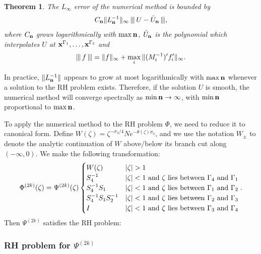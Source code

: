 \documentclass[11pt,fleqn]{article}
\numberwithin{equation}{section}
\newtheorem{theorem}{Theorem}[section]
\begin{document}
\def\nnnorm#1{ |\mskip-1.5mu\|\,{#1}\,\|\mskip-1.5mu|}

\begin{theorem}\cite{SORHFramework}
    The $L_\infty$ error of the numerical method is bounded by
%
        $$C_{\bf n} \|L_{\bf n}^{-1}\|_\infty \, \nnnorm{U -  \bar U_{\bf n}},$$
%
where $C_{\bf n}$ grows logarithmically with $\max {\bf n}$, $\bar U_{\bf n}$ is the polynomial which interpolates $U$ at ${\bf x}^{\Gamma_1},\ldots,{\bf x}^{\Gamma_\ell}$  and
%
    $$\nnnorm{f} = \| f\|_\infty + \max_{i} \| (M_i^{-1} )' f_i'   \|_\infty.$$
%
\end{theorem}


In practice, $\|L_{\bf n}^{-1}\|$ appears to grow at most logarithmically with $\max {\bf n}$ whenever a solution to the RH problem exists.  Therefore, if the solution $U$ is smooth, the numerical method will converge spectrally as $\min {\bf n} \rightarrow \infty$, with $\min {\bf n}$ proportional to $\max {\bf n}$.


To apply the numerical method to the RH problem $\Phi$, we need to reduce it to canonical form.   Define $W(\zeta) = \zeta^{-\sigma_3/4} N  e^{-\theta(\zeta)\sigma_3}$, and we use the notation $W_\pm$ to denote the analytic continuation of $W$ above/below its branch cut along $(-\infty,0)$.  We make the following transformation:
%
    \begin{equation}\label{PsiToPhi}
    \Phi^{(2k)}(\zeta) = \Psi^{(2k)}(\zeta) \begin{cases}
                W(\zeta)            & |\zeta| > 1 \\
                S_4^{-1}            & |\zeta| < 1\hbox{ and $\zeta$ lies between $\Gamma_4$ and $\Gamma_1$} \\
                S_4^{-1} S_1        & |\zeta| < 1\hbox{ and $\zeta$ lies between $\Gamma_1$ and $\Gamma_2$}\\
                S_4^{-1} S_1 S_2^{-1}        & |\zeta| < 1\hbox{ and $\zeta$ lies between $\Gamma_2$ and $\Gamma_3$}\\
                I               & |\zeta| < 1\hbox{ and $\zeta$ lies between $\Gamma_3$ and $\Gamma_4$}
                                      \end{cases}.
                                \end{equation}
%
Then $\Psi^{(2k)}$ satisfies the RH problem:

\subsubsection*{RH problem for $\Psi^{(2k)}$}
\end{document}

